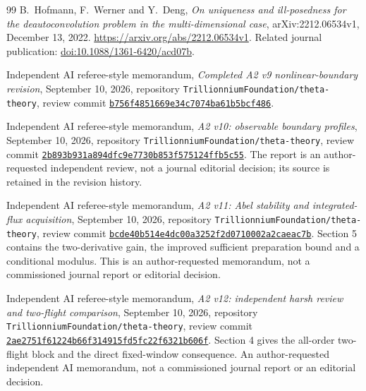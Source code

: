 \begin{thebibliography}{99}
B.~Hofmann, F.~Werner and Y.~Deng, \emph{On uniqueness and
ill-posedness for the deautoconvolution problem in the multi-dimensional
case}, arXiv:2212.06534v1, December 13, 2022.
\url{https://arxiv.org/abs/2212.06534v1}.
Related journal publication: \href{https://doi.org/10.1088/1361-6420/acd07b}{doi:10.1088/1361-6420/acd07b}.

Independent AI referee-style memorandum, \emph{Completed A2 v9
nonlinear-boundary revision}, September 10, 2026, repository
\texttt{Trillionnium\allowbreak Foundation/\allowbreak theta-theory}, review commit
\href{https://github.com/TrillionniumFoundation/theta-theory/commit/b756f4851669e34c7074ba61b5bcf48689756406}{\texttt{b756f485\allowbreak 1669e34c\allowbreak 7074ba61\allowbreak b5bcf486}}.

Independent AI referee-style memorandum, \emph{A2 v10: observable
boundary profiles}, September 10, 2026, repository
\texttt{Trillionnium\allowbreak Foundation/\allowbreak theta-theory}, review commit
\href{https://github.com/TrillionniumFoundation/theta-theory/commit/2b893b931a894dfc9e7730b853f575124ffb5c55}{\texttt{2b893b93\allowbreak 1a894dfc\allowbreak 9e7730b8\allowbreak 53f57512\allowbreak 4ffb5c55}}.
The report is an author-requested independent review, not a journal
editorial decision; its source is retained in the revision history.

Independent AI referee-style memorandum, \emph{A2 v11: Abel stability
and integrated-flux acquisition}, September 10, 2026, repository
\texttt{Trillionnium\allowbreak Foundation/\allowbreak theta-theory}, review commit
\href{https://github.com/TrillionniumFoundation/theta-theory/commit/bcde40b514e4dc00a3252f2d0710002a2caeac7b}{\texttt{bcde40b5\allowbreak 14e4dc00\allowbreak a3252f2d\allowbreak 0710002a\allowbreak 2caeac7b}}.
Section 5 contains the two-derivative gain, the improved sufficient
preparation bound and a conditional modulus. This is an author-requested
memorandum, not a commissioned journal report or editorial decision.

Independent AI referee-style memorandum, \emph{A2 v12: independent
harsh review and two-flight comparison}, September 10, 2026, repository
\texttt{Trillionnium\allowbreak Foundation/\allowbreak theta-theory}, review commit
\href{https://github.com/TrillionniumFoundation/theta-theory/commit/2ae2751f61224b66f314915fd5fc22f6321b606f}{\texttt{2ae2751f\allowbreak 61224b66\allowbreak f314915f\allowbreak d5fc22f6\allowbreak 321b606f}}.
Section 4 gives the all-order two-flight block and the direct fixed-window
consequence. An author-requested independent AI memorandum, not a
commissioned journal report or an editorial decision.


\end{thebibliography}
